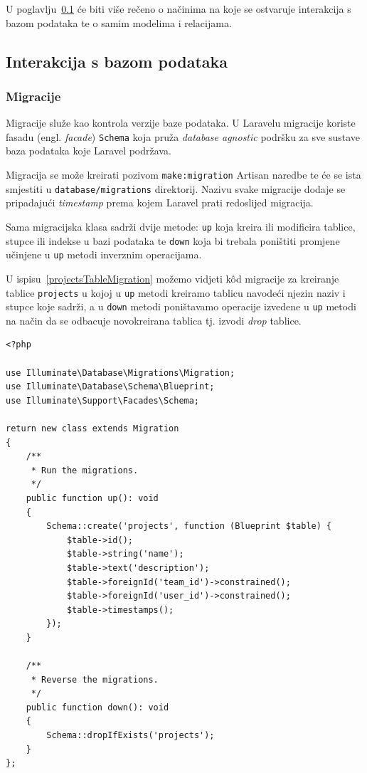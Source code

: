 U poglavlju~\ref{subsubsection:dbInteraction} će biti više rečeno o načinima na koje se ostvaruje interakcija s bazom podataka te o samim modelima i relacijama.

\subsection{Interakcija s bazom podataka}
\label{subsubsection:dbInteraction}

\subsubsection{Migracije}
Migracije služe kao kontrola verzije baze podataka. U Laravelu migracije koriste fasadu (engl. \textit{facade}) \texttt{Schema} koja pruža \textit{database agnostic} podršku za sve sustave baza podataka koje Laravel podržava.

Migracija se može kreirati pozivom \texttt{make:migration} Artisan naredbe te će se ista smjestiti u \texttt{database/migrations} direktorij. Nazivu svake migracije dodaje se pripadajući \textit{timestamp} prema kojem Laravel prati redoslijed migracija.

Sama migracijska klasa sadrži dvije metode: \texttt{up} koja kreira ili modificira tablice, stupce ili indekse u bazi podataka te \texttt{down} koja bi trebala poništiti promjene učinjene u \texttt{up} metodi inverznim operacijama.

U ispisu~\ref{projectsTableMigration} možemo vidjeti k\^od migracije za kreiranje tablice \texttt{projects} u kojoj u \texttt{up} metodi kreiramo tablicu navodeći njezin naziv i stupce koje sadrži, a u \texttt{down} metodi poništavamo operacije izvedene u \texttt{up} metodi na način da se odbacuje novokreirana tablica tj. izvodi \textit{drop} tablice.

\begin{lstlisting}[caption={Migracija za kreiranje tablice \texttt{projects}}, label=projectsTableMigration]
<?php

use Illuminate\Database\Migrations\Migration;
use Illuminate\Database\Schema\Blueprint;
use Illuminate\Support\Facades\Schema;

return new class extends Migration
{
    /**
     * Run the migrations.
     */
    public function up(): void
    {
        Schema::create('projects', function (Blueprint $table) {
            $table->id();
            $table->string('name');
            $table->text('description');
            $table->foreignId('team_id')->constrained();
            $table->foreignId('user_id')->constrained();
            $table->timestamps();
        });
    }

    /**
     * Reverse the migrations.
     */
    public function down(): void
    {
        Schema::dropIfExists('projects');
    }
};

\end{lstlisting}

